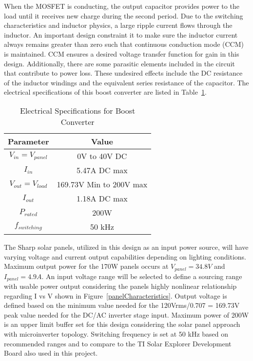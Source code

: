 When the MOSFET is conducting, the output capacitor provides power to the load until it receives new charge during the second period. Due to the switching characteristics and inductor physics, a large ripple current flows through the inductor. An important design constraint it to make sure the inductor current always remains greater than zero such that continuous conduction mode (CCM) is maintained. CCM ensures a desired voltage transfer function for gain in this design. Additionally, there are some parasitic elements included in the circuit that contribute to power loss. These undesired effects include the DC resistance of the inductor windings and the equivalent series resistance of the capacitor.  
The electrical specifications of this boost converter are listed in Table~\ref{specsBoost}. \\ 

\begin{table}
\centering
\begin{tabular}{|c|c|}
\hline
 Parameter & Value \\
 \hline
 $ V_{in} = V_{panel}$ & 0V to 40V DC \\
 \hline
 $ I_{in}$ & 5.47A DC max \\
 \hline
 $ V_{out}=V_{load} $ & 169.73V Min to 200V max \\
 \hline
 $ I_{out} $ & 1.18A DC max \\
 \hline
 $ P_{rated} $ & 200W \\
 \hline
 $ f_{switching} $ & 50 kHz \\
 \hline
\end{tabular}
\caption{Electrical Specifications for Boost Converter}
\label{specsBoost}
\end{table}

The Sharp solar panels, utilized in this design as an input power source,  will have varying voltage and current output capabilities depending on lighting conditions. Maximum output power for the 170W panels occurs at $V_{panel}=34.8V$ and  $I_{panel} = 4.9A$. An input voltage range will be selected to define a sourcing range with usable power output considering the panels highly nonlinear relationship regarding I vs V shown  in Figure~\ref{panelCharacteristics}. Output voltage is defined based on the minimum value needed for the 120Vrms/0.707 = 169.73V  peak value needed for the DC/AC inverter stage input. Maximum power of 200W is an upper limit buffer set for this design considering the solar panel approach with microinverter topology. Switching frequency is set at 50 kHz based on recommended ranges and to compare to the TI Solar Explorer Development Board also used in this project.\cite{SharpPanel}

